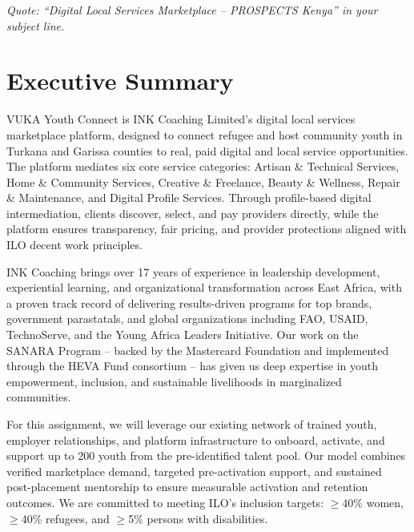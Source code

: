 \documentclass[11pt,a4paper]{article}
\begin{document}
\begin{titlepage}
    \vfill
    
    {\small\itshape Quote: ``Digital Local Services Marketplace -- PROSPECTS Kenya'' in your subject line.\par}
    
\end{titlepage}

\tableofcontents
\newpage

\section{Executive Summary}
\noindent VUKA Youth Connect is INK Coaching Limited's digital local services marketplace platform, designed to connect refugee and host community youth in Turkana and Garissa counties to real, paid digital and local service opportunities. The platform mediates six core service categories: Artisan \& Technical Services, Home \& Community Services, Creative \& Freelance, Beauty \& Wellness, Repair \& Maintenance, and Digital Profile Services. Through profile-based digital intermediation, clients discover, select, and pay providers directly, while the platform ensures transparency, fair pricing, and provider protections aligned with ILO decent work principles.

\noindent INK Coaching brings over 17 years of experience in leadership development, experiential learning, and organizational transformation across East Africa, with a proven track record of delivering results-driven programs for top brands, government parastatals, and global organizations including FAO, USAID, TechnoServe, and the Young Africa Leaders Initiative. Our work on the SANARA Program -- backed by the Mastercard Foundation and implemented through the HEVA Fund consortium -- has given us deep expertise in youth empowerment, inclusion, and sustainable livelihoods in marginalized communities.

\noindent For this assignment, we will leverage our existing network of trained youth, employer relationships, and platform infrastructure to onboard, activate, and support up to 200 youth from the pre-identified talent pool. Our model combines verified marketplace demand, targeted pre-activation support, and sustained post-placement mentorship to ensure measurable activation and retention outcomes. We are committed to meeting ILO's inclusion targets: $\geq$40\% women, $\geq$40\% refugees, and $\geq$5\% persons with disabilities.

\end{document}
